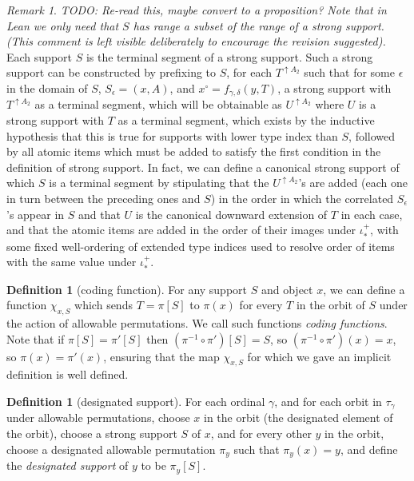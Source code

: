 \documentclass[112pt]{article}
\theoremstyle{definition}
\newtheorem{definition}[theorem]{Definition}
\theoremstyle{remark}
\newtheorem{remark}[theorem]{Remark}
\newcommand{\rk}[1]{{\color{blue}\sl #1}}
\begin{document}
\begin{remark}\label{rk:canonical_strong_support}
\rk{TODO: Re-read this, maybe convert to a proposition? Note that in Lean we only need that $S$ has range a subset of the range of a strong support. (This comment is left visible deliberately to encourage the revision suggested).}
Each support $S$ is the terminal segment of a strong support.  Such a strong support can be constructed by prefixing to $S$, for each $T^{\uparrow A_2}$ such that for some $\epsilon$ in the domain of $S$, $S_\epsilon = (x,A)$, and $x^\circ = f_{\gamma,\delta}(y,T)$, a strong support with $T^{\uparrow A_2}$ as a terminal segment, which will be obtainable as $U^{\uparrow A_2}$ where $U$ is a strong support with $T$ as a terminal segment, which exists by the inductive hypothesis that this is true for supports with lower type index than $S$, followed by all atomic items which must be added to satisfy the first condition in the definition of strong support.   In fact, we can define a canonical strong support of which $S$ is a terminal segment by stipulating that the $U^{\uparrow A_2}$'s are added (each one in turn between the preceding ones and $S$)  in the order in which the correlated
$S_\epsilon$'s appear in $S$ and that $U$ is the canonical downward extension of $T$ in each case, and that the atomic items are added in the order of their images under $\iota^+_*$, with some fixed well-ordering of extended type indices used to resolve order of items with the same value under $\iota^+_*$.
\end{remark}

\begin{definition}[coding function]\label{def:coding_function}
For any support $S$ and object $x$, we can define a function $\chi_{x,S}$ which sends $T=\pi[S]$ to $\pi(x)$ for every $T$ in the orbit of $S$ under
the action of allowable permutations.  We call such functions {\em coding functions\/}.  Note that if $\pi[S]=\pi'[S]$ then $(\pi^{-1}\circ \pi')[S]= S$, so
$(\pi^{-1}\circ \pi')(x)= x$, so $\pi(x)=\pi'(x)$, ensuring that the map $\chi_{x,S}$ for which we gave an implicit definition is well defined.
\end{definition}

\begin{definition}[designated support]
For each ordinal $\gamma$, and for each orbit in $\tau_\gamma$ under allowable permutations, choose $x$ in the orbit (the designated element of the orbit), choose a strong support $S$ of $x$,
{and for every other $y$ in the orbit, choose a designated allowable permutation $\pi_y$ such that $\pi_y(x) = y$, and define the {\em designated support\/} of $y$ to be $\pi_y[S]$.}
\end{definition}
\end{document}
